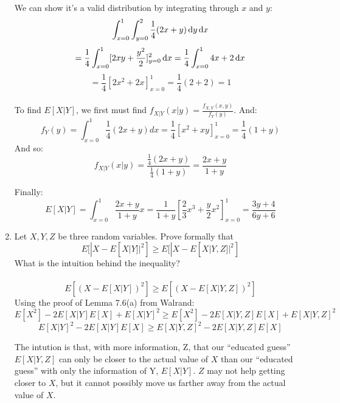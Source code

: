 \begin{enumerate}
    We can show it's a valid distribution by integrating through $x$ and $y$:
    $$\int_{x=0}^1 \int_{y=0}^2 \frac{1}{4}(2x+y) \operatorname{d}\!{y} \operatorname{d}\!{x}$$
    $$= \frac{1}{4} \int_{x=0}^1 [2xy + \frac{y^2}{2}]_{y=0}^2 \operatorname{d}\!{x} = \frac{1}{4} \int_{x=0}^1 4x + 2 \operatorname{d}\!{x}$$
    $$= \frac{1}{4} [2x^2 + 2x]_{x = 0}^1 = \frac{1}{4}(2+2) = 1$$\\

    To find $E[X|Y]$, we first must find $f_{X|Y}(x|y) = \frac{f_{X,Y}(x,y)}{f_Y(y)}$. And:
    $$f_Y(y) = \int_{x=0}^1 \frac{1}{4}(2x+y) dx = \frac{1}{4}[x^2 + xy]_{x=0}^1 = \frac{1}{4}(1+y)$$
    And so:
    $$f_{X|Y}(x|y) = \frac{\frac{1}{4}(2x+y)}{\frac{1}{4}(1+y)} = \frac{2x+y}{1+y}$$

    Finally:
    $$E[X|Y] = \int_{x=0}^1 \frac{2x+y}{1+y} x = \frac{1}{1+y} [\frac{2}{3}x^3 + \frac{y}{2}x^2]_{x=0}^1 = \frac{3y+4}{6y+6}$$

  \item Let $X,Y,Z$ be three random variables. Prove formally that
    $$E[|X - E[X|Y]|^2] \geq E[|X - E[X|Y,Z]|^2]$$
    What is the intuition behind the inequality?\\\\

    $$E[(X - E[X|Y])^2] \geq E[(X - E[X|Y,Z])^2]$$
    Using the proof of Lemma 7.6(a) from Walrand:
    $$E[X^2] - 2E[X|Y]E[X] + E[X|Y]^2 \geq E[X^2] - 2E[X|Y,Z]E[X] + E[X|Y,Z]^2$$
    $$E[X|Y]^2 - 2E[X|Y]E[X] \geq E[X|Y,Z]^2 - 2E[X|Y,Z]E[X]$$

    The intution is that, with more information, Z, that our ``educated guess'' $E[X|Y,Z]$ can only be closer to the actual value of $X$ than our ``educated guess'' with only the information of Y, $E[X|Y]$. $Z$ may not help getting closer to $X$, but it cannot possibly move us farther away from the actual value of $X$.\\

    
\end{enumerate}


